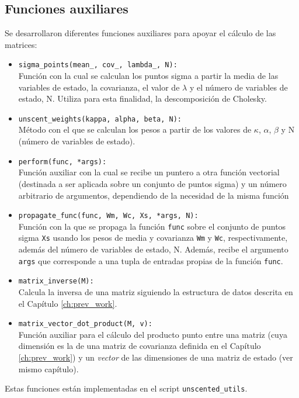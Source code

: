\subsection{Funciones auxiliares}
Se desarrollaron diferentes funciones auxiliares para apoyar el c\'alculo de las matrices:
\begin{itemize}
\item \texttt{sigma\_points(mean\_, cov\_, lambda\_, N):}\\
Funci\'on con la cual se calculan los puntos sigma a partir la media de las variables de estado, la covarianza, el valor de $\lambda$ y el n\'umero de variables de estado, N. Utiliza para esta finalidad, la descomposici\'on de Cholesky.
\item \texttt{unscent\_weights(kappa, alpha, beta, N):}\\
M\'etodo con el que se calculan los pesos a partir de los valores de $\kappa$, $\alpha$, $\beta$ y N (n\'umero de variables de estado). 
\item \texttt{perform(func, *args):}\\
Funci\'on auxiliar con la cual se recibe un puntero a otra funci\'on vectorial (destinada a ser aplicada sobre un conjunto de puntos sigma) y un n\'umero arbitrario de argumentos, dependiendo de la necesidad de la misma funci\'on
\item \texttt{propagate\_func(func, Wm, Wc, Xs, *args, N):}\\
Funci\'on con la que se propaga la funci\'on \texttt{func} sobre el conjunto de puntos sigma \texttt{Xs} usando los pesos de media y covarianza \texttt{Wm} y \texttt{Wc}, respectivamente, adem\'as del n\'umero de variables de estado, N. Adem\'as, recibe el argumento \texttt{args} que corresponde a una tupla de entradas propias de la funci\'on \texttt{func}.  
\item \texttt{matrix\_inverse(M):}\\
Calcula la inversa de una matriz siguiendo la estructura de datos descrita en el Cap\'itulo \ref{ch:prev_work}.
\item \texttt{matrix\_vector\_dot\_product(M, v):}\\
Funci\'on auxiliar para el c\'alculo del producto punto entre una matriz (cuya dimensi\'on es la de una matriz de covarianza definida en el Cap\'itulo \ref{ch:prev_work}) y un \textit{vector} de las dimensiones de una matriz de estado (ver mismo cap\'itulo).
\end{itemize}

Estas funciones est\'an implementadas en el script \texttt{unscented\_utils}.
